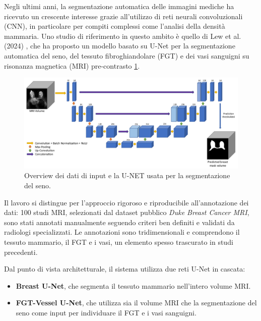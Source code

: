 Negli ultimi anni, la segmentazione automatica delle immagini mediche ha ricevuto un crescente interesse grazie all’utilizzo di reti neurali convoluzionali (CNN), in particolare per compiti complessi come l’analisi della densità mammaria. Uno studio di riferimento in questo ambito è quello di Lew et al. (2024) \cite{lew2024segmentation}, che ha proposto un modello basato su U-Net per la segmentazione automatica del seno, del tessuto fibroghiandolare (FGT) e dei vasi sanguigni su risonanza magnetica (MRI) pre-contrasto \ref{fig:schema_segmentazione_seno_paper}.

\begin{figure}[H] 
  	\centering 
 	\includegraphics[width=\textwidth]{images/2025-07-07-12-01-04.png} 
	 \caption{Overview dei dati di input e la U-NET usata per la segmentazione del seno.}
    \label{fig:schema_segmentazione_seno_paper}
 \end{figure} 

Il lavoro si distingue per l’approccio rigoroso e riproducibile all’annotazione dei dati: 100 studi MRI, selezionati dal dataset pubblico \textit{Duke Breast Cancer MRI}, sono stati annotati manualmente seguendo criteri ben definiti e validati da radiologi specializzati. Le annotazioni sono tridimensionali e comprendono il tessuto mammario, il FGT e i vasi, un elemento spesso trascurato in studi precedenti.

Dal punto di vista architetturale, il sistema utilizza due reti U-Net in cascata:
\begin{itemize}
\item \textbf{Breast U-Net}, che segmenta il tessuto mammario nell’intero volume MRI.
\item \textbf{FGT-Vessel U-Net}, che utilizza sia il volume MRI che la segmentazione del seno come input per individuare il FGT e i vasi sanguigni.
\end{itemize}

